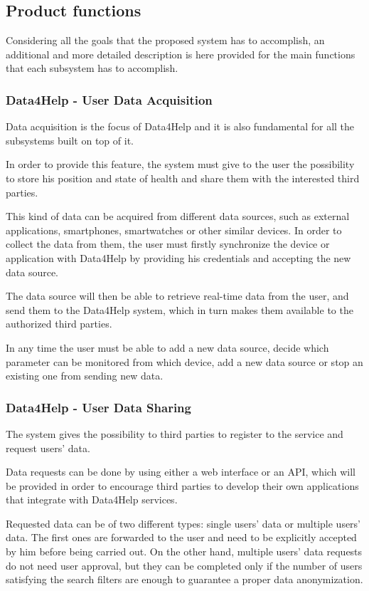 \subsection{Product functions}
Considering all the goals that the proposed system has to accomplish, an additional and more detailed description is here provided for the main functions that each subsystem has to accomplish.

\subsubsection{Data4Help - User Data Acquisition}
Data acquisition is the focus of Data4Help and it is also fundamental for all the subsystems built on top of it.

In order to provide this feature, the system must give to the user the possibility to store his position and state of health and share them with the interested third parties.
 
This kind of data can be acquired from different data sources, such as external applications, smartphones, smartwatches or other similar devices. In order to collect the data from them, the user must firstly synchronize the device or application with Data4Help by providing his credentials and accepting the new data source.

The data source will then be able to retrieve real-time data from the user, and send them to the Data4Help system, which in turn makes them available to the authorized third parties.

In any time the user must be able to add a new data source, decide which parameter can be monitored from which device, add a new data source or stop an existing one from sending new data.

\subsubsection{Data4Help - User Data Sharing}
The system gives the possibility to third parties to register to the service and request users' data.

Data requests can be done by using either a web interface or an API, which will be provided in order to encourage third parties to develop their own applications that integrate with Data4Help services.

Requested data can be of two different types: single users' data or multiple users' data. The first ones are forwarded to the user and need to be explicitly accepted by him before being carried out. On the other hand, multiple users' data requests do not need user approval, but they can be completed only if the number of users satisfying the search filters are enough to guarantee a proper data anonymization.

